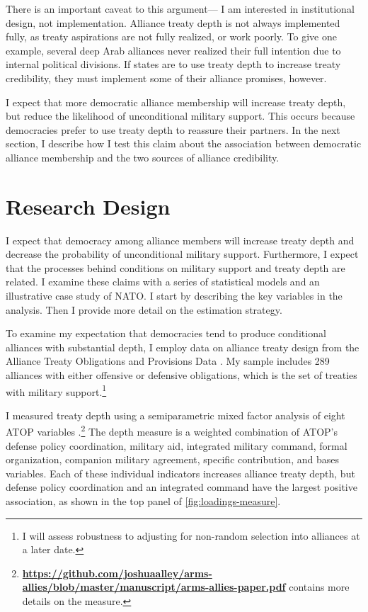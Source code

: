 \documentclass[12pt]{article}
\begin{document}
There is an important caveat to this argument--- I am interested in institutional design, not implementation.
Alliance treaty depth is not always implemented fully, as treaty aspirations are not fully realized, or work poorly. 
To give one example, several deep Arab alliances never realized their full intention due to internal political divisions.  
If states are to use treaty depth to increase treaty credibility, they must implement some of their alliance promises, however. 


I expect that more democratic alliance membership will increase treaty depth, but reduce the likelihood of unconditional military support.  
This occurs because democracies prefer to use treaty depth to reassure their partners. 
In the next section, I describe how I test this claim about the association between democratic alliance membership and the two sources of alliance credibility. 



\section{Research Design}

 
I expect that democracy among alliance members will increase treaty depth and decrease the probability of unconditional military support. 
Furthermore, I expect that the processes behind conditions on military support and treaty depth are related. 
I examine these claims with a series of statistical models and an illustrative case study of NATO. 
I start by describing the key variables in the analysis. 
Then I provide more detail on the estimation strategy. 


To examine my expectation that democracies tend to produce conditional alliances with substantial depth, I employ data on alliance treaty design from the Alliance Treaty Obligations and Provisions Data \citep{Leedsetal2002}. 
My sample includes 289 alliances with either offensive or defensive obligations, which is the set of treaties with military support.\footnote{I will assess robustness to adjusting for non-random selection into alliances at a later date.} 


I measured treaty depth using a semiparametric mixed factor analysis of eight ATOP variables \citep{Murrayetal2013}.\footnote{\textbf{\url{https://github.com/joshuaalley/arms-allies/blob/master/manuscript/arms-allies-paper.pdf}} contains more details on the measure.}
The depth measure is a weighted combination of ATOP's defense policy coordination, military aid, integrated military command, formal organization, companion military agreement, specific contribution, and bases variables. 
Each of these individual indicators increases alliance treaty depth, but defense policy coordination and an integrated command have the largest positive association, as shown in the top panel of \autoref{fig:loadings-measure}. 
\end{document}
